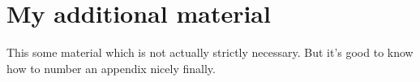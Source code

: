 \thispagestyle{empty}
\section{My additional material}
This some material which is not actually strictly necessary.
But it's good to know how to number an appendix nicely finally.

\Blindtext